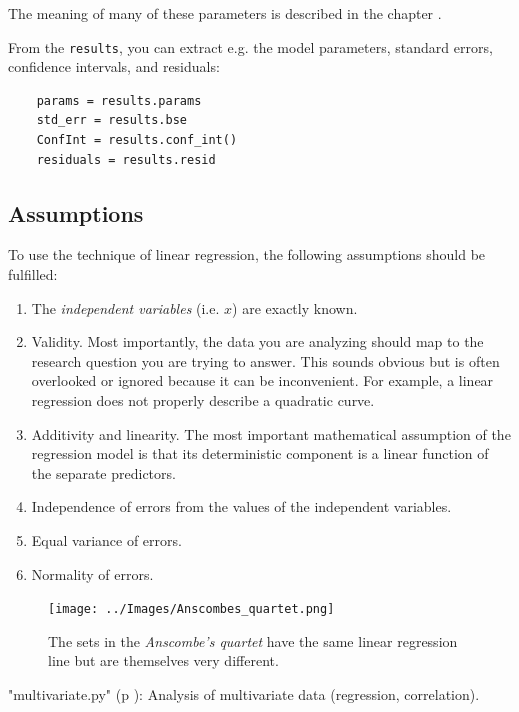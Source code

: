The meaning of many of these parameters is described in the chapter .

From the \lstinline{results}, you can extract e.g. the model parameters, standard errors, confidence intervals, and residuals:

\begin{lstlisting}
    params = results.params
    std_err = results.bse
    ConfInt = results.conf_int()
    residuals = results.resid
\end{lstlisting}

\subsection{Assumptions}

To use the technique of linear regression, the following assumptions should be fulfilled:

\begin{enumerate}
  \item The \emph{independent variables} (i.e. $x$) are exactly known.
  \item Validity. Most importantly, the data you are analyzing should map to the research question you are trying to answer. This sounds obvious but is often overlooked or ignored because it can be inconvenient. For example, a linear regression does not properly describe a quadratic curve.
  \item Additivity and linearity. The most important mathematical assumption of the regression model is that its deterministic component is a linear function of the separate predictors.
  \item Independence of errors from the values of the independent variables.
  \item Equal variance of errors.
  \item Normality of errors.
\end{enumerate}

\begin{figure}
  \centering
  \texttt{[image: ../Images/Anscombes\_quartet.png]}\\
  \caption{The sets in the \emph{Anscombe's quartet} have the same linear regression line but are themselves very different.}
\end{figure}

\PyImg "multivariate.py" (p \pageref{py:multivariate}): Analysis of multivariate data (regression, correlation).

